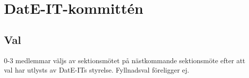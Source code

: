 \section{DatE-IT-kommittén}
\subsection{Val}
  0-3 medlemmar väljs av sektionsmötet på nästkommande sektionsmöte efter att val har utlysts av DatE-ITs styrelse. Fyllnadsval föreligger ej.
\newpage
